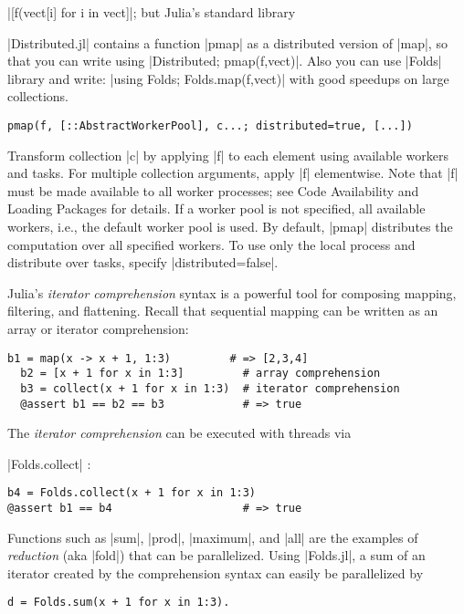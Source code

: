 |[f(vect[i] for i in vect]|; but Julia's standard library 

|Distributed.jl| contains a function |pmap| as a distributed version of |map|, so that you can write using |Distributed; pmap(f,vect)|. Also you can use |Folds| library and write: |using Folds; Folds.map(f,vect)| with good speedups on large collections.
\begin{lstlisting}[language=JuliaLocal, style=julia, mathescape=false]
  pmap(f, [::AbstractWorkerPool], c...; distributed=true, [...])
\end{lstlisting}


Transform collection |c| by applying |f| to each element using available workers and tasks. For multiple collection arguments, apply |f| elementwise. Note that |f| must be made available to all worker processes; see Code Availability and Loading Packages for details.
If a worker pool is not specified, all available workers, i.e., the default worker pool is used.
By default, |pmap| distributes the computation over all specified workers. To use only the local process and distribute over tasks, specify |distributed=false|.


Julia's \emph{iterator comprehension} syntax is a powerful tool for composing mapping, filtering, and flattening. Recall that sequential mapping can be written as an array or iterator comprehension:
\begin{lstlisting}[language=JuliaLocal, style=julia, mathescape=false]
  b1 = map(x -> x + 1, 1:3)         # => [2,3,4]
  b2 = [x + 1 for x in 1:3]         # array comprehension
  b3 = collect(x + 1 for x in 1:3)  # iterator comprehension
  @assert b1 == b2 == b3            # => true
\end{lstlisting}	

The \emph{iterator comprehension} can be executed with threads via 

|Folds.collect| \cite{julia:parallel:data-parallelism}:
\begin{lstlisting}[language=JuliaLocal, style=julia, mathescape=false]
b4 = Folds.collect(x + 1 for x in 1:3)
@assert b1 == b4                    # => true
\end{lstlisting}

Functions such as |sum|, |prod|, |maximum|, and |all| are the examples of \emph{reduction} (aka |fold|) that can be parallelized. Using |Folds.jl|, a sum of an iterator created by the comprehension syntax can easily be parallelized by
\begin{lstlisting}[language=JuliaLocal, style=julia, mathescape=false]
  d = Folds.sum(x + 1 for x in 1:3).
\end{lstlisting}


